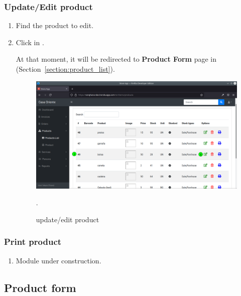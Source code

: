 \documentclass[a4paper,11pt]{refart}
\newcommand\InConstruction{\color{red} Module under construction.}
\begin{document}
\subsubsection{Update/Edit product}
\begin{enumerate}
	\item Find the product to edit.
	\item Click in .
	\medskip
	\begin{leftbar}
	 At that moment, it will be redirected to \textbf{Product Form} page in (Section~\ref{section:product_list}).
	\end{leftbar}
	\begin{figure}[H]\centering
		\includegraphics[width=\textwidth]{images/produc_list-update.png}
		\caption{update/edit product}
		\label{fig:produc_list-update.png}.
	\end{figure}
\end{enumerate}

\subsubsection{Print product}
\begin{enumerate}
	\item \InConstruction{}
\end{enumerate}

\subsection{Product form}\label{section:product_form}
\end{document}
